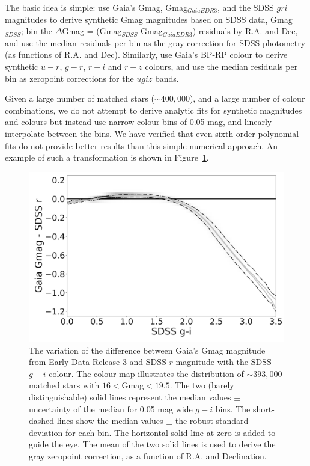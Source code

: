 \documentclass[fleqn,usenatbib]{mnras}
\begin{document}
The basic idea is simple: use Gaia's Gmag, Gmag$_{GaiaEDR3}$, and the SDSS $gri$ magnitudes
to derive synthetic Gmag magnitudes based on SDSS data, Gmag$_{SDSS}$; bin the 
$\Delta$Gmag = (Gmag$_{SDSS}$-Gmag$_{GaiaEDR3}$) residuals by R.A. and Dec, and 
use the median residuals per bin as the gray correction for SDSS photometry (as functions
of R.A. and Dec). Similarly, use Gaia's BP-RP colour to derive synthetic $u-r$, $g-r$, $r-i$
and $r-z$ colours, and use the median residuals per bin as zeropoint corrections for 
the $ugiz$ bands. 

Given a large number of matched stars ($\sim 400,000$), and a large number of colour combinations,
we do not attempt to derive analytic fits for synthetic magnitudes and colours but instead
use narrow colour bins of 0.05 mag, and linearly interpolate between the bins. We have verified
that even sixth-order polynomial fits do not provide better results than this simple 
numerical approach. An example of such a transformation is shown in Figure~\ref{fig:GrVSgi}. 


\begin{figure}
  \centering\includegraphics[width=0.95\columnwidth]{figures/GrVSgi_lr.png} 
\caption{The variation of the difference between Gaia's Gmag magnitude from Early Data Release 3
and SDSS $r$ magnitude with the SDSS $g-i$ colour.
The  colour map illustrates the distribution of $\sim 393,000$ matched stars with 
$16<$Gmag$<19.5$. The two (barely distinguishable) solid lines represent the median 
values $\pm$ uncertainty of the median for 0.05 mag wide $g-i$ bins. The short-dashed 
lines show the median values $\pm$ the robust standard deviation for 
each bin. The horizontal solid line at zero is added to guide the eye. The mean of 
the two solid lines is used to derive the gray zeropoint correction, as a function of R.A.
and Declination.}
\label{fig:GrVSgi}
\end{figure}
\end{document}
